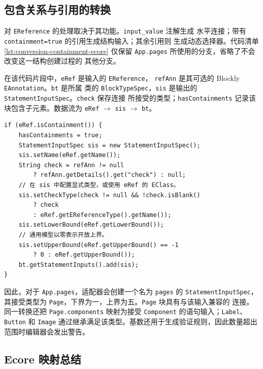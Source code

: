 \subsection{包含关系与引用的转换}

对 \texttt{EReference} 的处理取决于其功能。\texttt{input\_value} 注解生成
水平连接；带有 \texttt{containment=true} 的引用生成结构输入；其余引用则
生成动态选择器。代码清单 \ref{lst:conversion-containment-ecore} 仅保留
\texttt{App.pages} 所使用的分支，省略了不会改变这一结构创建过程的
其他分支。

在该代码片段中，\texttt{eRef} 是输入的 \texttt{EReference}，
\texttt{refAnn} 是其可选的 Blockly \texttt{EAnnotation}。\texttt{bt} 是所属
类的 \texttt{BlockTypeSpec}，\texttt{sis} 是输出的
\texttt{Statement}\allowbreak\texttt{InputSpec}。\texttt{check} 保存连接
所接受的类型；\texttt{hasContainments} 记录该块包含子元素。数据流为
\texttt{eRef} $\rightarrow$ \texttt{sis} $\rightarrow$ \texttt{bt}。

\begin{lstlisting}[style=tfmjavaecore, captionpos=t, caption={Ecore 包含关系到结构输入的转换}, label={lst:conversion-containment-ecore}]
if (eRef.isContainment()) {
    hasContainments = true;
    StatementInputSpec sis = new StatementInputSpec();
    sis.setName(eRef.getName());
    String check = refAnn != null
        ? refAnn.getDetails().get("check") : null;
    // 在 sis 中配置显式类型，或使用 eRef 的 EClass。
    sis.setCheckType(check != null && !check.isBlank()
        ? check
        : eRef.getEReferenceType().getName());
    sis.setLowerBound(eRef.getLowerBound());
    // 通用模型以零表示开放上界。
    sis.setUpperBound(eRef.getUpperBound() == -1
        ? 0 : eRef.getUpperBound());
    bt.getStatementInputs().add(sis);
}
\end{lstlisting}

因此，对于 \texttt{App.pages}，适配器会创建一个名为
\texttt{pages} 的 \texttt{Statement}\allowbreak\texttt{InputSpec}，其接受类型为
\texttt{Page}，下界为一，上界为五。\texttt{Page} 块具有与该输入兼容的
连接。同一转换还把 \texttt{Page.components} 映射为接受
\texttt{Component} 的语句输入；\texttt{Label}、\texttt{Button} 和
\texttt{Image} 通过继承满足该类型。基数还用于生成验证规则，因此数量超出
范围时编辑器会发出警告。

\subsection{Ecore 映射总结}

